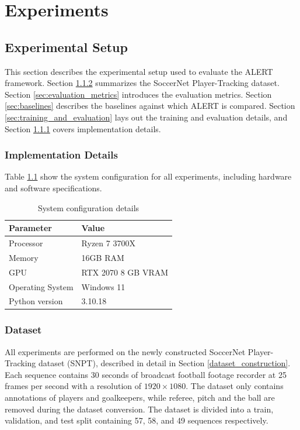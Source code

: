 \chapter{Experiments}\label{chapter:experiments}

\section{Experimental Setup}

This section describes the experimental setup used to evaluate the ALERT framework. Section \ref{sec:dataset} summarizes the SoccerNet Player-Tracking dataset. Section \ref{sec:evaluation_metrics} introduces the evaluation metrics. Section \ref{sec:baselines} describes the baselines against which ALERT is compared. Section \ref{sec:training_and_evaluation} lays out the training and evaluation details, and Section \ref{sec:implementation_details} covers implementation details.

\subsection{Implementation Details}\label{sec:implementation_details}
Table \ref{tab:system_configs} show the system configuration for all experiments, including hardware and software specifications. 


\begin{table}[h]
\centering
\begin{tabular}{ll}
\toprule
\textbf{Parameter} & \textbf{Value} \\
\midrule
Processor & Ryzen 7 3700X \\
Memory & 16GB RAM \\
GPU & RTX 2070 8 GB VRAM \\
Operating System & Windows 11 \\
Python version & 3.10.18 \\

\bottomrule

\end{tabular}
\caption{System configuration details}
\label{tab:system_configs}
\end{table}

\subsection{Dataset}\label{sec:dataset}
All experiments are performed on the newly constructed SoccerNet Player-Tracking dataset (SNPT), described in detail in Section \ref{dataset_construction}. Each sequence contains 30 seconds of broadcast  football footage recorder at 25 frames per second with a resolution of $1920 \times 1080$. The dataset only contains annotations of players and goalkeepers, while referee, pitch and the ball are removed during the dataset conversion. The dataset is divided into a train, validation, and test split containing 57, 58, and 49 sequences respectively. 

